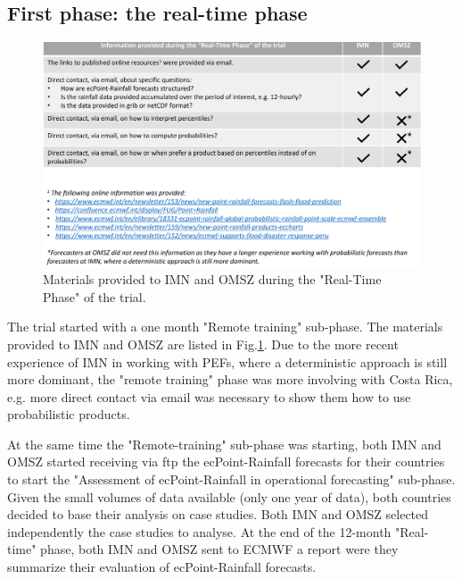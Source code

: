 \documentclass[twocol]{ametsocV5} %
\begin{document}
\subsection{First phase: the real-time phase}
 \begin{figure}
\centerline{\includegraphics[width=39pc]{manuscript/Figures/Fig5.png}}
\caption{Materials provided to IMN and OMSZ during the "Real-Time Phase" of the trial. }
\label{Fig5}
\end{figure}
 
The trial started with a one month "Remote training" sub-phase. The materials provided to IMN and OMSZ are listed in Fig.\ref{Fig5}. Due to the more recent experience of IMN in working with PEFs, where a deterministic approach is still more dominant, the "remote training" phase was more involving with Costa Rica, e.g. more direct contact via email was necessary to show them how to use probabilistic products.\par  

At the same time the "Remote-training" sub-phase was starting, both IMN and OMSZ started receiving via ftp the ecPoint-Rainfall forecasts for their countries to start the "Assessment of ecPoint-Rainfall in operational forecasting" sub-phase. Given the small volumes of data available (only one year of data), both countries decided to base their analysis on case studies. Both IMN and OMSZ selected independently the case studies to analyse. At the end of the 12-month "Real-time" phase, both IMN and OMSZ sent to ECMWF a report were they summarize their evaluation of ecPoint-Rainfall forecasts.
	
\end{document}
